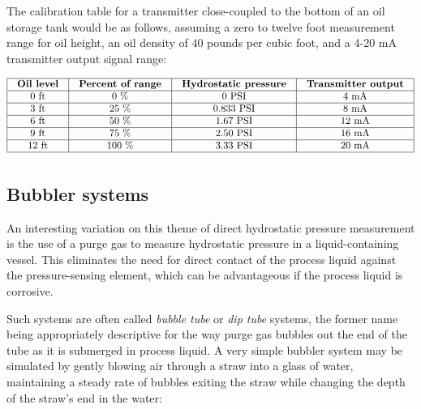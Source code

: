 \vskip 10pt

The calibration table for a transmitter close-coupled to the bottom of an oil storage tank would be as follows, assuming a zero to twelve foot measurement range for oil height, an oil density of 40 pounds per cubic foot, and a 4-20 mA transmitter output signal range:


$$\vbox{\offinterlineskip
\halign{\strut
\vrule \quad\hfil # \ \hfil & 
\vrule \quad\hfil # \ \hfil & 
\vrule \quad\hfil # \ \hfil & 
\vrule \quad\hfil # \ \hfil \vrule \cr
\noalign{\hrule}
%
\textbf{Oil level} & \textbf{Percent of range} & \textbf{Hydrostatic pressure} & \textbf{Transmitter output} \cr
%
\noalign{\hrule}
%
0 ft & 0 \% & 0 PSI & 4 mA \cr
%
\noalign{\hrule}
%
3 ft & 25 \% & 0.833 PSI & 8 mA \cr
%
\noalign{\hrule}
%
6 ft & 50 \% & 1.67 PSI & 12 mA \cr
%
\noalign{\hrule}
%
9 ft & 75 \% & 2.50 PSI & 16 mA \cr
%
\noalign{\hrule}
%
12 ft & 100 \% & 3.33 PSI & 20 mA \cr
%
\noalign{\hrule}
} %
}$$ %







\filbreak
\subsection{Bubbler systems}

An interesting variation on this theme of direct hydrostatic pressure measurement is the use of a purge gas to measure hydrostatic pressure in a liquid-containing vessel.  This eliminates the need for direct contact of the process liquid against the pressure-sensing element, which can be advantageous if the process liquid is corrosive.

Such systems are often called \textit{bubble tube} or \textit{dip tube} systems, the former name being appropriately descriptive for the way purge gas bubbles out the end of the tube as it is submerged in process liquid.  A very simple bubbler system may be simulated by gently blowing air through a straw into a glass of water, maintaining a steady rate of bubbles exiting the straw while changing the depth of the straw's end in the water:

